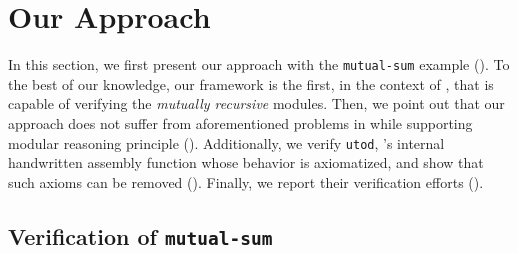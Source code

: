 \section{Our Approach}
\label{sec:program:solution}

In this section, we first present our approach with the \texttt{mutual-sum} example ().
To the best of our knowledge, our framework is the first, in the context of \cc{}, that is capable of verifying the \emph{mutually recursive} modules.
Then, we point out that our approach does not suffer from aforementioned problems in  while supporting modular reasoning principle ().
Additionally, we verify \texttt{utod}, \cc{}'s internal handwritten assembly function whose behavior is axiomatized, and show that such axioms can be removed ().
Finally, we report their verification efforts ().

\subsection{Verification of \texttt{mutual-sum}}
\label{sec:program:solution:mutsum}
\begin{figure}[t]
\label{fig:modulelocal}
\end{figure}

